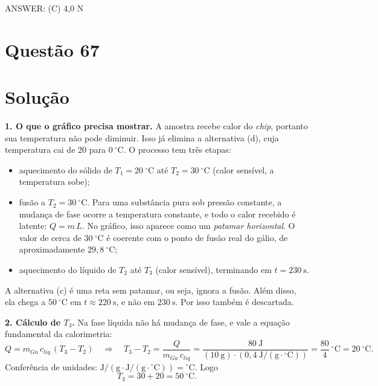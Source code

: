 \documentclass{article}%
\begin{document}
ANSWER: (C) 4,0 N%
\newpage%
\section*{Questão 67}

\section*{Solução}

\textbf{1. O que o gráfico precisa mostrar.} A amostra recebe calor do \emph{chip}, portanto sua temperatura não pode diminuir. Isso já elimina a alternativa (d), cuja temperatura cai de $20$ para $0\ ^\circ\mathrm{C}$. O processo tem três etapas:
\begin{itemize}
\item aquecimento do sólido de $T_1 = 20\ ^\circ\mathrm{C}$ até $T_2 = 30\ ^\circ\mathrm{C}$ (calor sensível, a temperatura sobe);
\item fusão a $T_2 = 30\ ^\circ\mathrm{C}$. Para uma substância pura sob pressão constante, a mudança de fase ocorre a temperatura constante, e todo o calor recebido é latente: $Q = m\,L$. No gráfico, isso aparece como um \emph{patamar horizontal}. O valor de cerca de $30\ ^\circ\mathrm{C}$ é coerente com o ponto de fusão real do gálio, de aproximadamente $29{,}8\ ^\circ\mathrm{C}$;
\item aquecimento do líquido de $T_2$ até $T_3$ (calor sensível), terminando em $t = 230\ \mathrm{s}$.
\end{itemize}
A alternativa (c) é uma reta sem patamar, ou seja, ignora a fusão. Além disso, ela chega a $50\ ^\circ\mathrm{C}$ em $t \approx 220\ \mathrm{s}$, e não em $230\ \mathrm{s}$. Por isso também é descartada.

\textbf{2. Cálculo de $T_3$.} Na fase líquida não há mudança de fase, e vale a equação fundamental da calorimetria:
\[
Q = m_{Ga}\,c_{liq}\,(T_3 - T_2)
\quad\Longrightarrow\quad
T_3 - T_2 = \frac{Q}{m_{Ga}\,c_{liq}} = \frac{80\ \mathrm{J}}{(10\ \mathrm{g})\cdot\left(0{,}4\ \mathrm{J/(g\cdot {}^\circ C)}\right)} = \frac{80}{4}\ ^\circ\mathrm{C} = 20\ ^\circ\mathrm{C}.
\]
Conferência de unidades: $\mathrm{J} / \left(\mathrm{g}\cdot \mathrm{J/(g\cdot{}^\circ C)}\right) = {}^\circ\mathrm{C}$. Logo
\[
T_3 = 30 + 20 = 50\ ^\circ\mathrm{C}.
\]
\end{document}
